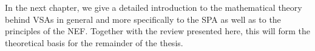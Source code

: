 In the next chapter, we give a detailed introduction to the mathematical theory behind \acp{VSA} in general and more specifically to the \ac{SPA} as well as to the principles of the \ac{NEF}.
Together with the review presented here, this  will form the theoretical basis for the remainder of the thesis.
